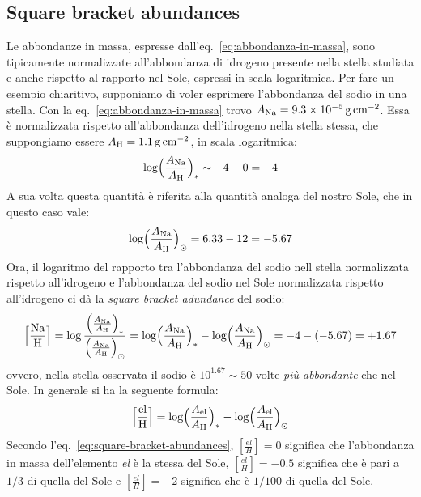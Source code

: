 \subsection{Square bracket abundances}
Le abbondanze in massa, espresse dall'eq.~\eqref{eq:abbondanza-in-massa}, sono tipicamente normalizzate all'abbondanza di idrogeno presente nella stella studiata e anche rispetto al rapporto nel Sole, espressi in scala logaritmica. Per fare un esempio chiaritivo, supponiamo di voler esprimere l'abbondanza del sodio in una stella. Con la eq.~\eqref{eq:abbondanza-in-massa} trovo $A_\textup{Na} = \SI{9.3e-5}{g.cm^{-2}}$. Essa è normalizzata rispetto all'abbondanza dell'idrogeno nella stella stessa, che suppongiamo essere $A_\textup{H} = \SI{1.1}{g.cm^{-2}}$, in scala logaritmica:
\[
\log \Bigl( \dfrac{A_\textup{Na}}{A_\textup{H}} \Bigr)_* \sim -4 -0 = -4    
\]
A sua volta questa quantità è riferita alla quantità analoga del nostro Sole, che in questo caso vale:
\[
    \log \Bigl( \dfrac{A_\textup{Na}}{A_\textup{H}} \Bigr)_\odot = 6.33 - 12 = -5.67
\]
Ora, il logaritmo del rapporto tra l'abbondanza del sodio nell stella normalizzata rispetto all'idrogeno e l'abbondanza del sodio nel Sole normalizzata rispetto all'idrogeno ci dà la \emph{square bracket adundance} del sodio:
\[
\Bigl[ \dfrac{\textup{Na}}{\textup{H}} \Bigr] = \log \dfrac{\Bigl(\frac{A_\textup{Na}}{A_\textup{H}}\Bigr)_*}{\Bigl(\frac{A_\textup{Na}}{A_\textup{H}}\Bigr)_\odot} = \log \Bigl( \dfrac{A_\textup{Na}}{A_\textup{H}} \Bigr)_* - \log \Bigl( \dfrac{A_\textup{Na}}{A_\textup{H}} \Bigr)_\odot = -4 -(-5.67) = +1.67
\]
ovvero, nella stella osservata il sodio è $10^{1.67} \sim 50$ volte \emph{più abbondante} che nel Sole. In generale si ha la seguente formula:
\begin{equation}\label{eq:square-bracket-abundances}
    \Bigl[ \dfrac{\textup{el}}{\textup{H}} \Bigr] = \log \Bigl( \dfrac{A_\textup{el}}{A_\textup{H}} \Bigr)_* - \log \Bigl( \dfrac{A_\textup{el}}{A_\textup{H}} \Bigr)_\odot
\end{equation}
Secondo l'eq.~\eqref{eq:square-bracket-abundances}, $[\frac{el}{H}] = 0$ significa che l'abbondanza in massa dell'elemento \emph{el} è la stessa del Sole, $[\frac{el}{H}] = -0.5$ significa che è pari a $1/3$ di quella del Sole e $[\frac{el}{H}] = -2$ significa che è $1/100$ di quella del Sole.